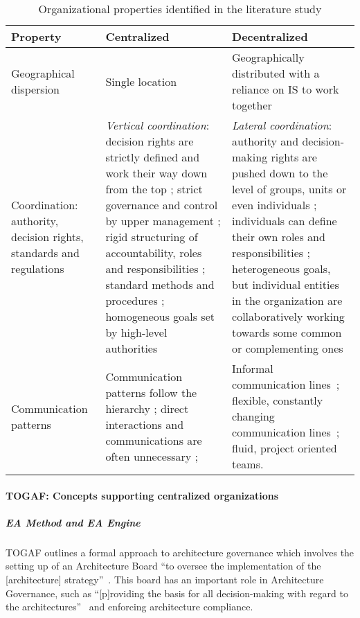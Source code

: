 \begin{table}
\caption{Organizational properties identified in the literature study}
\label{table:org_characteristics}
\begin{tabular}{ | p{} | p{}| p{} |}
%
\hline
%
\textbf{Property} & 
\textbf{Centralized} &
\textbf{Decentralized}  \\
%
\hline
%
Geographical dispersion \cite{luthans2006} & 
Single location &
Geographically distributed with a reliance on IS to work together \cite{applegate1988} \\
%
\hline
%
Coordination: authority, decision rights, standards and regulations & 
\textit{Vertical coordination}: decision rights are strictly defined and work their way down from the top \cite{Weill2004,pearlson2009}; strict governance and control by upper management \cite{pearlson2009,applegate1988}; rigid structuring of accountability, roles and responsibilities \cite{applegate1988}; standard methods and procedures \cite{mintzberg1981}; homogeneous goals set by high-level authorities \cite{Bolman2008} &
\textit{Lateral coordination}: authority and decision-making rights are pushed down to the level of groups, units or even individuals \cite{Weill2004,pearlson2009,robbins1997,Camarinha-Matos2005}; individuals can define their own roles and responsibilities \cite{valveHandbook}; heterogeneous goals, but individual entities in the organization are collaboratively working towards some common or complementing ones~\cite{Camarinha-Matos2005} \\
%
\hline
%
Communication patterns  & 
Communication patterns follow the hierarchy \cite{pearlson2009,applegate1988}; direct interactions and communications are often unnecessary \cite{thompson1967}; &
Informal communication lines~\cite{pearlson2009}; flexible, constantly changing communication lines~\cite{ahuja1998network}; fluid, project oriented teams.~\cite{applegate1988} \\
%
\hline
%
\end{tabular}
\end{table}

\paragraph*{TOGAF: Concepts supporting centralized organizations}

\subparagraph*{EA Method and EA Engine}
TOGAF outlines a formal approach to architecture governance which involves the setting up of an Architecture Board ``to oversee the implementation of the [architecture] strategy''~\cite[Ch. 47]{togaf9.1}. This board has an important role in Architecture Governance, such as ``[p]roviding the basis for all decision-making with regard to the architectures''~\cite[Ch. 47]{togaf9.1} and enforcing architecture compliance. 

